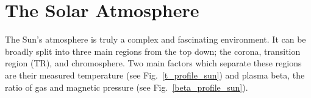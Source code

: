 \section{The Solar Atmosphere}
\label{sec:sol_atmos}
The Sun's atmosphere is truly a complex and fascinating environment. It can be broadly  split into three main regions from the top down; the corona, transition region (TR), and chromosphere. Two main factors which separate these regions are their measured temperature (see Fig.~\ref{t_profile_sun}) and plasma beta, the ratio of gas and magnetic pressure (see Fig.~\ref{beta_profile_sun}).
